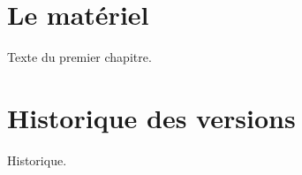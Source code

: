 \documentclass{article}
\begin{document}
\tableofcontents
\section{Le mat\'eriel}
Texte du premier chapitre.
\section*{Historique des versions}
Historique.
\end{document}

